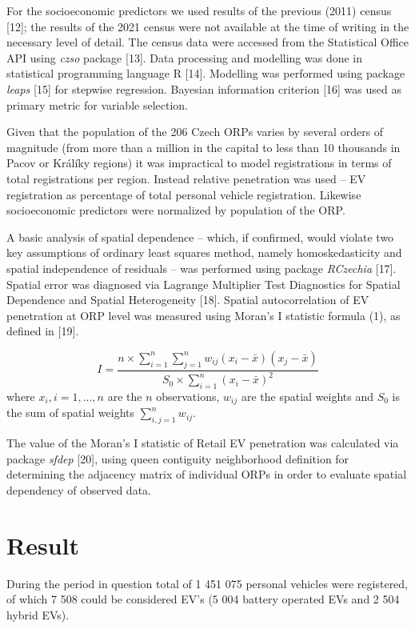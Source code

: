 \documentclass{mmeproc}
\begin{document}
For the socioeconomic predictors we used results of the previous (2011)
census {[}12{]}; the results of the 2021 census were not available at
the time of writing in the necessary level of detail. The census data
were accessed from the Statistical Office API using \emph{czso} package
{[}13{]}. Data processing and modelling was done in statistical
programming language R {[}14{]}. Modelling was performed using package
\emph{leaps} {[}15{]} for stepwise regression. Bayesian information
criterion {[}16{]} was used as primary metric for variable selection.

Given that the population of the 206 Czech ORPs varies by several orders
of magnitude (from more than a million in the capital to less than 10
thousands in Pacov or Králíky regions) it was impractical to model
registrations in terms of total registrations per region. Instead
relative penetration was used -- EV registration as percentage of total
personal vehicle registration. Likewise socioeconomic predictors were
normalized by population of the ORP.

A basic analysis of spatial dependence -- which, if confirmed, would
violate two key assumptions of ordinary least squares method, namely
homoskedasticity and spatial independence of residuals -- was performed
using package \emph{RCzechia} {[}17{]}. Spatial error was diagnosed via
Lagrange Multiplier Test Diagnostics for Spatial Dependence and Spatial
Heterogeneity {[}18{]}. Spatial autocorrelation of EV penetration at ORP
level was measured using Moran's I statistic formula (1), as defined in {[}19{]}.

\[
I = \frac{n \times \sum_{i=1}^n\sum_{j=1}^n w_{ij}(x_i - \bar{x})(x_j - \bar{x})}{S_0 \times \sum_{i=1}^n (x_i - \bar{x})^2} \tag{1}
\]
where \(x_i, i = 1, ..., n\) are the \(n\) observations, \(w_{ij}\)
are the spatial weights and \(S_0\) is the sum of spatial weights
\(\sum_{i, j=1}^n w_{ij}\).

The value of the Moran's I statistic of Retail EV penetration was
calculated via package \emph{sfdep} {[}20{]}, using queen contiguity
neighborhood definition for determining the adjacency matrix of
individual ORPs in order to evaluate spatial dependency of observed
data.

\hypertarget{result}{%
\section{Result}\label{result}}

During the period in question total of 1 451 075 personal vehicles were
registered, of which 7 508 could be considered EV's (5 004 battery
operated EVs and 2 504 hybrid EVs).
\end{document}
